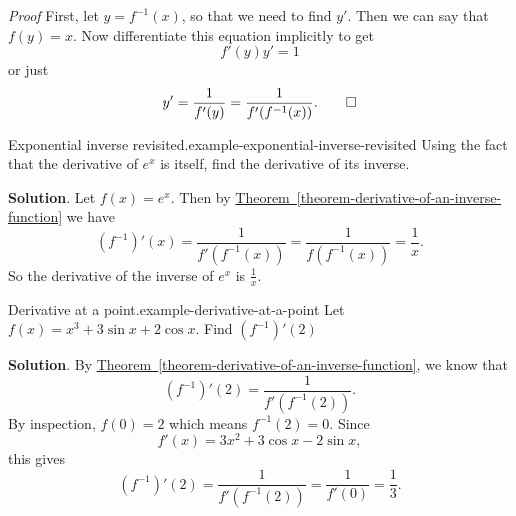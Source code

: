 \documentclass[10pt,]{book}
\makeatletter
\renewcommand*{\proofname}{Proof}
\renewenvironment{proof}[1][\proofname]{\par
  \pushQED{\qed}%
  \normalfont \topsep6\p@\@plus6\p@\relax
  \trivlist
  \item\relax
    {\itshape
    #1\@addpunct{.}}\hspace\labelsep\ignorespaces
}{%
  \popQED\endtrivlist\@endpefalse
}
\numberwithin{equation}{section}
\makeatother
\begin{document}
\begin{proof}\hypertarget{proof-4}{}
\hypertarget{p-212}{}%
First, let \(y = f^{-1}(x)\), so that we need to find \(y'\). Then we can say that \(f(y) = x\). Now differentiate this equation implicitly to get%
\begin{equation*}
f'(y)y' = 1
\end{equation*}
or just%
\begin{equation*}
y' = \frac{1}{f'(y)} = \frac{1}{f'(f^{-1}(x))}.\qedhere
\end{equation*}
%
\end{proof}
\begin{example}{Exponential inverse revisited.}{example-exponential-inverse-revisited}%
\hypertarget{p-213}{}%
Using the fact that the derivative of \(e^{x}\) is itself, find the derivative of its inverse.%
\par\smallskip%
\noindent\textbf{Solution}.\hypertarget{solution-46}{}\quad%
\hypertarget{p-214}{}%
Let \(f(x) = e^{x}\). Then by \hyperref[theorem-derivative-of-an-inverse-function]{Theorem~\ref{theorem-derivative-of-an-inverse-function}} we have%
\begin{equation*}
(f^{-1})'(x) = \frac{1}{f'(f^{-1}(x))} = \frac{1}{f(f^{-1}(x))} = \frac{1}{x}.
\end{equation*}
So the derivative of the inverse of \(e^{x}\) is \(\frac{1}{x}\).%
\end{example}
\begin{example}{Derivative at a point.}{example-derivative-at-a-point}%
\hypertarget{p-215}{}%
Let \(f(x) = x^{3} + 3\sin x + 2\cos x\). Find \((f^{-1})'(2)\)%
\par\smallskip%
\noindent\textbf{Solution}.\hypertarget{solution-47}{}\quad%
\hypertarget{p-216}{}%
By \hyperref[theorem-derivative-of-an-inverse-function]{Theorem~\ref{theorem-derivative-of-an-inverse-function}}, we know that%
\begin{equation*}
(f^{-1})'(2) = \frac{1}{f'(f^{-1}(2))}.
\end{equation*}
By inspection, \(f(0) = 2\) which means \(f^{-1}(2) = 0\). Since%
\begin{equation*}
f'(x) = 3x^{2} + 3\cos x - 2\sin x,
\end{equation*}
this gives%
\begin{equation*}
(f^{-1})'(2) = \frac{1}{f'(f^{-1}(2))} = \frac{1}{f'(0)} = \frac{1}{3}.
\end{equation*}
%
\end{example}
%
%
\typeout{************************************************}
\typeout{************************************************}
%
\end{document}
